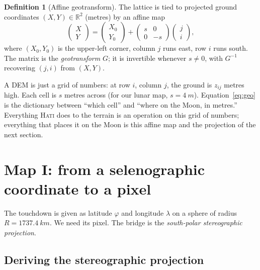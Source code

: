 \documentclass[11pt]{article}
\theoremstyle{definition}
\newtheorem{definition}{Definition}[section]
\newcommand{\R}{\mathbb{R}}
\begin{document}
\begin{definition}[Affine geotransform]
The lattice is tied to projected ground coordinates $(X,Y)\in\R^2$ (metres) by an
affine map
\begin{equation}
\begin{pmatrix}X\\Y\end{pmatrix}
=\begin{pmatrix}X_0\\Y_0\end{pmatrix}
+\begin{pmatrix} s & 0\\ 0 & -s\end{pmatrix}
\begin{pmatrix} j \\ i\end{pmatrix},
\label{eq:geo}
\end{equation}
where $(X_0,Y_0)$ is the upper-left corner, column $j$ runs east, row $i$ runs
south. The matrix is the \emph{geotransform} $G$; it is invertible whenever
$s\neq0$, with $G^{-1}$ recovering $(j,i)$ from $(X,Y)$.
\end{definition}

\begin{words}
A DEM is just a grid of numbers: at row $i$, column $j$, the ground is $z_{ij}$
metres high. Each cell is $s$ metres across (for our lunar map, $s=\SI{4}{m}$).
Equation~\eqref{eq:geo} is the dictionary between ``which cell'' and ``where on the
Moon, in metres.'' Everything \textsc{Hati} does to the terrain is an operation on
this grid of numbers; everything that places it on the Moon is this affine map and
the projection of the next section.
\end{words}

\section{Map I: from a selenographic coordinate to a pixel}

The touchdown is given as latitude $\varphi$ and longitude $\lambda$ on a sphere of
radius $R=\SI{1737.4}{km}$. We need its pixel. The bridge is the
\emph{south-polar stereographic projection}.

\subsection{Deriving the stereographic projection}
\end{document}
